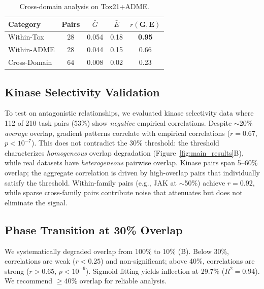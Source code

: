 \documentclass[sigconf,nonacm]{acmart}
\newcommand{\G}{\mathbf{G}}
\newcommand{\E}{\mathbf{E}}
\begin{document}
\begin{table}[!h]
\caption{Cross-domain analysis on Tox21+ADME.}
\label{tab:cross_domain}
\vskip 0.1in
\begin{center}
\begin{small}
\begin{tabular*}{\columnwidth}{@{\extracolsep{\fill}}lcccc@{}}
\toprule
Category & Pairs & $\bar{G}$ & $\bar{E}$ & $r(\G, \E)$ \\
\midrule
Within-Tox & 28 & 0.054 & 0.18 & \textbf{0.95} \\
Within-ADME & 28 & 0.044 & 0.15 & 0.66 \\
Cross-Domain & 64 & 0.008 & 0.02 & 0.23 \\
\bottomrule
\end{tabular*}
\end{small}
\end{center}
\end{table}

\subsection{Kinase Selectivity Validation}

To test on antagonistic relationships, we evaluated kinase selectivity data \cite{davis2011kinase} where 112 of 210 task pairs (53\%) show \textit{negative} empirical correlations. Despite $\sim$20\% \textit{average} overlap, gradient patterns correlate with empirical correlations ($r = 0.67$, $p < 10^{-7}$). This does not contradict the 30\% threshold: the threshold characterizes \textit{homogeneous} overlap degradation (Figure~\ref{fig:main_results}B), while real datasets have \textit{heterogeneous} pairwise overlap. Kinase pairs span 5--60\% overlap; the aggregate correlation is driven by high-overlap pairs that individually satisfy the threshold. Within-family pairs (e.g., JAK at $\sim$50\%) achieve $r = 0.92$, while sparse cross-family pairs contribute noise that attenuates but does not eliminate the signal.

\subsection{Phase Transition at 30\% Overlap}

We systematically degraded overlap from 100\% to 10\% (B). Below 30\%, correlations are weak ($r < 0.25$) and non-significant; above 40\%, correlations are strong ($r > 0.65$, $p < 10^{-9}$). Sigmoid fitting yields inflection at 29.7\% ($R^2 = 0.94$). We recommend $\geq$40\% overlap for reliable analysis.
\end{document}
